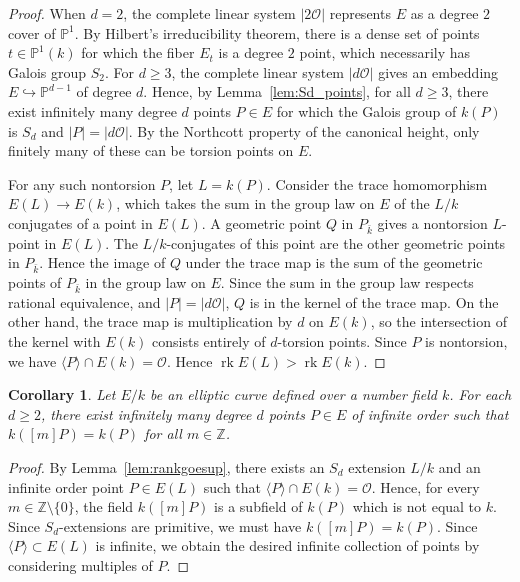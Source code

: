 \documentclass[a4paper,11pt]{amsart}
\theoremstyle{plain}
\newtheorem{coroll}[thm]{Corollary}
\theoremstyle{remark}
\renewcommand{\P}{\mathbb{P}}
\newcommand{\rk}{\operatorname{rk}}
\begin{document}
\begin{proof}

When \(d=2\), the complete linear system \(|2\mathcal{O}|\) represents \(E\) as a degree \(2\) cover of \(\P^1\).  By Hilbert's irreducibility theorem, there is a dense set of points \(t \in \P^1(k)\) for which the fiber \(E_t\) is a degree \(2\) point, which necessarily has Galois group \(S_2\).  For \(d\geq 3\), the complete linear system \(|d\mathcal{O}|\) gives an embedding \(E \hookrightarrow \P^{d-1}\) of degree \(d\).  Hence, by Lemma~\ref{lem:Sd_points}, for all \(d \geq 3\), there exist infinitely many degree \(d\) points \(P \in E\) for which the Galois group of \(k(P)\) is \(S_d\) and \(|P| = |d\mathcal{O}|\). By the Northcott property of the canonical height, only finitely many of these can be torsion points on \(E\).

For any such nontorsion \(P\), let \(L = k(P)\).
Consider the trace homomorphism \(E(L) \to E(k)\), which takes the sum in the group law on \(E\) of the \(L/k\) conjugates of a point in \(E(L)\).
A geometric point \(Q\) in \(P_{\bar{k}}\) gives a nontorsion \(L\)-point in \(E(L)\).  The \(L/k\)-conjugates of this point are the other geometric points in \(P_{\bar{k}}\).  Hence the image of \(Q\) under the trace map is the sum of the geometric points of \(P_{\bar{k}}\) in the group law on \(E\).  Since the sum in the group law respects rational equivalence, and \(|P| = |d \mathcal{O}|\), \(Q\) is in the kernel of the trace map.  On the other hand, the trace map is multiplication by \(d\) on \(E(k)\), so the intersection of the kernel with \(E(k)\) consists entirely of \(d\)-torsion points.  Since \(P\) is nontorsion, we have \(\langle P \rangle \cap E(k) = \mathcal{O}\).  Hence \(\rk E(L) > \rk E(k)\). 
\end{proof}

\begin{coroll}\label{cor:k(mx)=k(x)}
    Let $E/k$ be an elliptic curve defined over a number field $k$. 
    For each \(d \geq 2\), there exist infinitely many degree \(d\) points $P\in E$ of infinite order such that \(k([m]P) = k(P)\) for all \(m \in \mathbb{Z}\).
\end{coroll}

\begin{proof}
By Lemma~\ref{lem:rankgoesup}, there exists an \(S_d\) extension \(L/k\) and an infinite order point \(P \in E(L)\) such that \(\langle P \rangle \cap E(k) = \mathcal{O}\).  Hence, for every \(m \in \mathbb{Z} \setminus \{0\}\), the field \(k([m]P)\) is a subfield of \(k(P)\) which is not equal to \(k\).  Since \(S_d\)-extensions are primitive, we must have \(k([m]P) = k(P)\).  Since \(\langle P \rangle \subset E(L)\) is infinite, we obtain the desired infinite collection of points by considering multiples of \(P\).
\end{proof}
\end{document}
